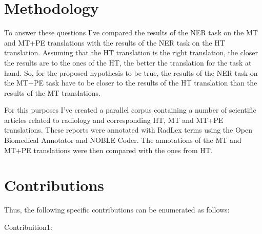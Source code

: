 \section{Methodology}

To answer these questions I've compared the results of the NER task on the MT and MT+PE translations with the results of the NER task on the HT translation. Assuming that the HT translation is the right translation, the closer the results are to the ones of the HT, the better the translation for the task at hand. So, for the proposed hypothesis to be true, the results of the NER task on the MT+PE task have to be closer to the results of the HT translation than the results of the MT translations.

For this purposes I've created a parallel corpus containing a number of scientific articles related to radiology and corresponding HT, MT and MT+PE translations. These reports were annotated with RadLex terms using the Open Biomedical Annotator and NOBLE Coder. The annotations of the MT and MT+PE translations were then compared with the ones from HT.


\section{Contributions}


Thus, the following specific contributions can be enumerated as follows:
\begin{description}
	\item[Contribuition1:] 
\end{description}


